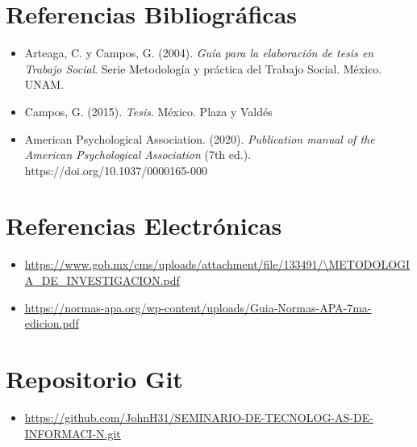 \documentclass[12pt]{article}
\begin{document}
\section*{Referencias Bibliográficas}
\begin{itemize}
    \item Arteaga, C. y Campos, G. (2004). \textit{Guía para la elaboración de tesis en Trabajo Social}. Serie Metodología y práctica del Trabajo Social. México. UNAM.
    \item Campos, G. (2015). \textit{Tesis}. México. Plaza y Valdés
    \item American Psychological Association. (2020). \textit{Publication manual of the American Psychological Association} (7th ed.). https://doi.org/10.1037/0000165-000
\end{itemize}

\section*{Referencias Electrónicas}
\begin{itemize}
    \item \url{https://www.gob.mx/cms/uploads/attachment/file/133491/\METODOLOGIA_DE_INVESTIGACION.pdf}
    \item 
    \url{https://normas-apa.org/wp-content/uploads/Guia-Normas-APA-7ma-edicion.pdf}
\end{itemize}

\section*{Repositorio Git}
\begin{itemize}
    \item \url{https://github.com/JohnH31/SEMINARIO-DE-TECNOLOG-AS-DE-INFORMACI-N.git}
\end{itemize}
\end{document}
